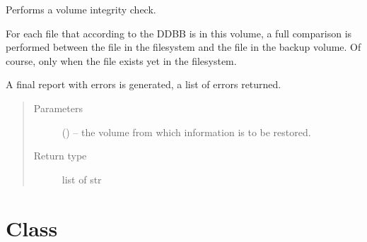 \documentclass[letterpaper,10pt,english]{sphinxmanual}
\begin{document}
\begin{fulllineitems}
\begin{fulllineitems}
\begin{quote}
\begin{description}
\end{description}\end{quote}

\end{fulllineitems}


\begin{fulllineitems}
\label{\detokenize{index:fsbackup.fileDB.FileDB.volumeIntegrityCheck}}
Performs a volume integrity check.

For each file that according to the DDBB is in this volume, a full comparison
is performed between the file in the filesystem and the file in the backup volume.
Of course, only when the file exists yet in the filesystem.

A final report with errors is generated, a list of errors returned.
\begin{quote}\begin{description}
\item[{Parameters}] \leavevmode
{} ({\hyperref[\detokenize{index:fsbackup.hashVolume.HashVolume}]{}}) -- the volume from which information is to be restored.

\item[{Return type}] \leavevmode
list of str

\end{description}\end{quote}

\end{fulllineitems}


\end{fulllineitems}



\section{Class }
\label{\detokenize{index:class-mountpathindrive}}\label{\detokenize{index:module-fsbackup.mountPathInDrive}}\label{\detokenize{index:module-mountPathInDrive}}
\end{document}
